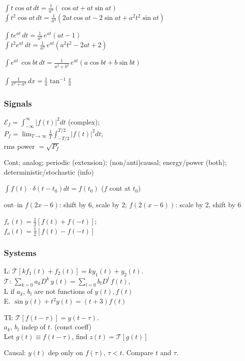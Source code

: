 \documentclass[4pt]{article}
\theoremstyle{definition}
\theoremstyle{definition}
\newcommand{\ra}{\rightarrow}
\begin{document}
\begin{landscape}
\begin{multicols}{3}
    $\int t \cos at \, dt = \frac{1}{a^2}(\cos at + at\sin at)$\\
    $\int t^2 \cos at\, dt = \frac{1}{a^3}(2at\cos at - 2\sin at + a^2t^2\sin at)$

    $\int te^{at}\, dt = \frac{1}{a^2} \, e^{at} (at-1)$\\
    $\int t^2 e^{at} \, dt = \frac{1}{a^3} \, e^{at} (a^2t^2 - 2at + 2)$

    $\int e^{at} \,\cos bt \, dt = \frac{1}{a^2+b^2} \,e^{at}(a\cos 
    bt + b \sin bt)$

    \(\int \frac{1} {x^2+a^2}\, dx = \frac{1}{a} \tan^{-1} \frac x a\)
\columnbreak
\subsubsection*{Signals}
    $\mathcal{E}_f = \int_{-\infty}^{\infty} |f(t)|^2 dt$ (complex); \\
    $P_f = \lim_{T\ra\infty}\frac{1}{T} \int^{T/2}_{-T/2} |f(t)|^2 dt $; \\
    rms power $= \sqrt {P_f}$

    Cont; 
    analog; 
    periodic (extension); 
    (non/anti)causal; 
    energy/power (both); 
    deterministic/stochastic (info)

    $\int f(t)\cdot \delta(t - t_0) dt = f(t_0)$ ($f$ cont at $t_0$)
    

    out--in  $f(2x-6)$: shift by 6, scale by 2; $f(2(x-6))$: scale by 2, shift by 6

    $f_e(t) = \frac{1}{2}[f(t) + f(-t)]$; \\
    $f_o(t) = \frac{1}{2}[f(t) - f(-t)]$
\subsubsection*{Systems}
    L: $\mathcal{T}[kf_1(t) + f_2(t)] = ky_1(t) + y_2(t)$.\\
    $\mathcal{T}$: $\sum_{k=0}a_k D^k \, y(t) = \sum_{l=0}b_lD^l\, f(t)$,\\
    L if $a_k$, $b_l$ are not functions of $y(t), f(t)$\\
    E. $\sin\dot{y}(t) + t^2 y(t) = (t+3) f(t)$
    
    TI: $\mathcal{T}[f(t-\tau)] = y(t-\tau)$.\\
    $a_k$, $b_l$ indep of $t$. (const coeff)\\
    Let $g(t)\equiv f(t-\tau)$, find $z(t) = \mathcal{T}[g(t)]$


    Causal: $y(t)$ dep only on $f(\tau)$, $\tau < t$. 
    Compare $t$ and $\tau$.
    

\end{multicols}
\end{landscape}
\end{document}
